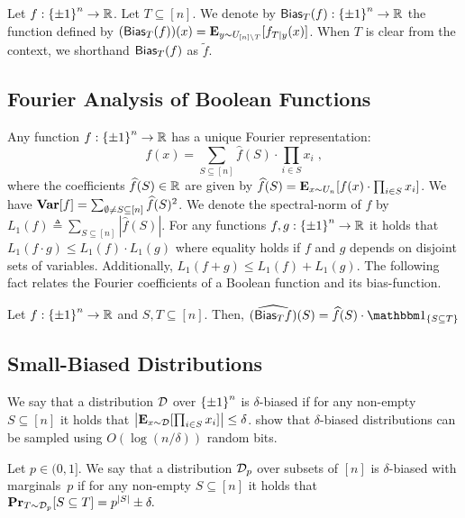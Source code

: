 \begin{definition}\label{def:bias_function}
Let $f: {\{\pm1\}}^n \to {\mathbb{R}}$.
Let $T \subseteq [n]$. 
We denote by $\mathsf{Bias}_T(f): {\{\pm1\}}^n \to  {\mathbb{R}}$ the function defined by $(\mathsf{Bias}_T(f))(x) = \mathop{\bf E\/}_{y\sim U_{[n]\setminus T}}[f_{T|y}(x)]$.
When $T$ is clear from the context, we shorthand $\mathsf{Bias}_T(f)$ as $\tilde{f}$.
\end{definition}

\subsection{Fourier Analysis of Boolean Functions}\label{subsec:Fourier}
Any function $f: {\{\pm1\}}^n \to {\mathbb{R}}$ has a unique Fourier representation:
\[ f(x) = \sum_{S\subseteq[n]} \hat{f}(S) \cdot \prod_{i\in S} x_i\;,\]
where the coefficients $\widehat{f}(S) \in {\mathbb{R}}$ are given by $\widehat{f}(S) = \mathop{\bf E\/}_{x\sim U_n} [f(x) \cdot \prod_{i\in S} x_i]$.
We have ${\mathop{\bf Var\/}}[f] = \sum_{\emptyset \neq S \subseteq [n]}{\widehat{f}(S)^2}$.
We denote the {\sf spectral-norm} of $f$ by $L_1(f) \triangleq \sum_{S \subseteq [n]} |\hat{f}(S)|$.
For any functions $f,g: {\{\pm1\}}^n \to {\mathbb{R}}$ it holds that $L_1(f\cdot g) \le L_1(f) \cdot L_1(g)$ where equality holds if $f$ and $g$ depends on disjoint sets of variables. Additionally, $L_1(f+g) \le L_1(f) + L_1(g)$.
The following fact relates the Fourier coefficients of a Boolean function and its bias-function.


\begin{fact}\label{fact:bias-fnc-Fourier}
	Let $f: {\{\pm1\}}^n \to {\mathbb{R}}$ and $S, T \subseteq [n]$. Then,
$\widehat{(\Bias_T f)}(S) = \hat{f}(S) \cdot \one_{\{S \subseteq T\}}$
\end{fact}

\subsection{Small-Biased Distributions}
We say that a distribution ${\mathcal{D}}$ over ${\{\pm1\}}^n$ is {\sf $\delta$-biased}  if for any non-empty $S \subseteq [n]$ it holds that
$\left|\mathop{\bf E\/}_{x\sim {\mathcal{D}}}[\prod_{i\in S} x_i]\right| \le \delta$. \cite{NaorNaor93,AlonGHP92,Ta-Shma17} show that $\delta$-biased distributions can be sampled using $O(\log(n/\delta))$ random bits. 

Let $p \in (0,1]$. We say that a distribution ${\mathcal{D}}_p$ over subsets of $[n]$ is {\sf $\delta$-biased with marginals~$p$} if for any non-empty $S \subseteq [n]$ it holds that
$\mathop{\bf Pr\/}_{T\sim {\mathcal{D}}_p} [S \subseteq T] = p^{|S|} \pm \delta.
$

